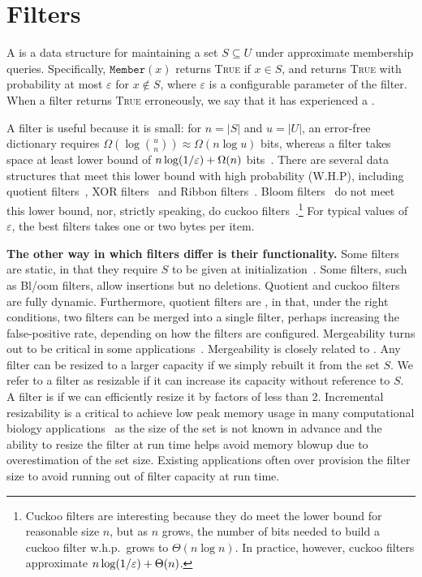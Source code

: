 
\section{Filters}

A  is a data structure for maintaining a set $S\subseteq U$ under approximate membership queries. Specifically, $\texttt{Member}(x)$ returns \textsc{True} if $x\in S$, and returns \textsc{True} with probability at most $\varepsilon$ for $x\notin S$, where $\varepsilon$ is a configurable parameter of the filter.  When a filter returns \textsc{True} erroneously, we say that it has experienced a .

A filter is useful because it is small: for $n= |S|$ and $u = |U|$, an error-free dictionary requires $\Omega(\log {u\choose n}) \approx \Omega(n \log u)$ bits, whereas a filter  takes space at least  lower bound of $n\log (1/\varepsilon) + \Omega(n)$ bits~\cite{CarterFG78}.  There are several data structures that meet this lower bound with high probability (W.H.P), including quotient filters~\cite{Cleary84,PaghPaRa05,DillingerM09,BenderFaJo12,PandeyBJP17,PandeyCDBFJ21}, XOR filters~\cite{GrafLe20} and Ribbon filters~\cite{DillingerW21}.  Bloom filters~\cite{Bloom70} do not meet this lower bound, nor, strictly speaking, do cuckoo filters~\cite{FanAnKa14,BreslowJ18}.\footnote{Cuckoo filters are interesting because they do meet the lower bound for reasonable size $n$, but as $n$ grows, the number of bits needed to build a cuckoo filter w.h.p.\ grows to $\Theta(n\log n)$.  In practice, however, cuckoo filters approximate $n\log (1/\varepsilon) + \Theta(n)$.}
%
For typical values of $\varepsilon$, the best filters takes one or two bytes per item.

\noindent
{\bf The other way in which filters differ is their functionality.} Some filters are static, in that they require $S$ to be given at initialization~\cite{GrafLe20,DillingerW21}.  Some filters, such as Bl/oom filters, allow insertions but no deletions.  Quotient and cuckoo filters are fully dynamic.  Furthermore, quotient filters are , in that, under the right conditions, two filters can be merged into a single filter, perhaps increasing the false-positive rate, depending on how the filters are configured.  Mergeability turns out to be critical in some applications~\cite{conway2020splinterdb,PandeyABFJP18Cell}. Mergeability is closely related to .  Any filter can be resized to a larger capacity if we  simply rebuilt it from the set $S$.  We refer to a filter as resizable if it can increase its capacity without reference to $S$.  A filter is  if we can efficiently resize it by factors of less than 2.  Incremental resizability is a critical to achieve low peak memory usage in many computational biology applications~\cite{hofmeyr2020terabase,PandeyBJP17,PandeyBJP17a,MarccaisKi11,wood2014kraken,wood2019improved} as the size of the set is not known in advance and the ability to resize the filter at run time helps avoid memory blowup due to overestimation of the set size. Existing applications often over provision the filter size to avoid running out of filter capacity at run time.

